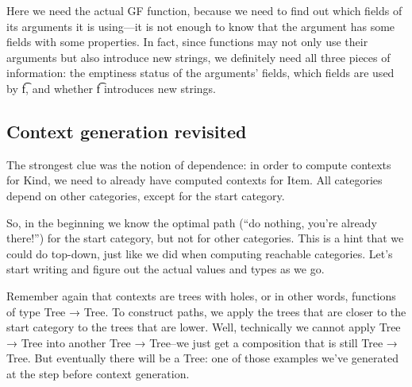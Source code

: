 Here we need the actual GF function, because we need to find out which fields of its arguments it is using---it is not enough to know that the argument has some fields with some properties. In fact, since functions may not only use their arguments but also introduce new strings, we definitely need all three pieces of information: the emptiness status of the arguments’ fields, which fields are used by \t{f}, and whether \t{f} introduces new strings.

\subsection{Context generation revisited}

The strongest clue was the notion of dependence: in order to compute contexts for Kind, we need to already have computed contexts for Item. All categories depend on other categories, except for the start category.

So, in the beginning we know the optimal path (“do nothing, you’re already there!”) for the start category, but not for other categories. This is a hint that we could do top-down, just like we did when computing reachable categories. Let’s start writing and figure out the actual values and types as we go.

Remember again that contexts are trees with holes, or in other words, functions of type Tree → Tree. To construct paths, we apply the trees that are closer to the start category to the trees that are lower. Well, technically we cannot apply Tree → Tree into another Tree → Tree–we just get a composition that is still Tree → Tree. But eventually there will be a Tree: one of those examples we’ve generated at the step before context generation. 


